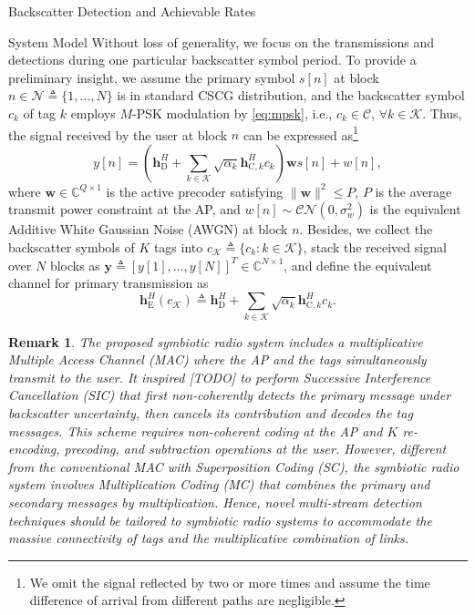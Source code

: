 \documentclass[journal]{IEEEtran}
\newtheorem{remark}{Remark}
\begin{document}
\begin{section}{Backscatter Detection and Achievable Rates}
\begin{subsection}{System Model}
			Without loss of generality, we focus on the transmissions and detections during one particular backscatter symbol period. To provide a preliminary insight, we assume the primary symbol $s[n]$ at block $n \in \mathcal{N} \triangleq \{1,\ldots,N\}$ is in standard CSCG distribution, and the backscatter symbol $c_k$ of tag $k$ employs $M$-PSK modulation by \eqref{eq:mpsk}, i.e., $c_k \in \mathcal{C}$, $\forall k \in \mathcal{K}$. Thus, the signal received by the user at block $n$ can be expressed as\footnote{We omit the signal reflected by two or more times\cite{Wu2019} and assume the time difference of arrival from different paths are negligible\cite{Guo2019b}.}
			\begin{equation}
				y[n] = \left(\boldsymbol{h}_{\mathrm{D}}^H + \sum_{k \in \mathcal{K}} \sqrt{\alpha_k} \boldsymbol{h}_{\mathrm{C},k}^H c_k\right) \boldsymbol{w} s[n] + w[n],
				\label{eq:received_signal}
			\end{equation}
			where $\boldsymbol{w} \in \mathbb{C}^{Q \times 1}$ is the active precoder satisfying $\lVert \boldsymbol{w} \rVert^2 \le P$, $P$ is the average transmit power constraint at the AP, and $w[n] \sim \mathcal{CN}(0,\sigma_w^2)$ is the equivalent Additive White Gaussian Noise (AWGN) at block $n$. Besides, we collect the backscatter symbols of $K$ tags into $c_{\mathcal{K}} \triangleq \{c_k : k \in \mathcal{K}\}$, stack the received signal over $N$ blocks as $\boldsymbol{y} \triangleq \left[y[1],\ldots,y[N]\right]^T \in \mathbb{C}^{N \times 1}$, and define the equivalent channel for primary transmission as
			\begin{equation}
				\boldsymbol{h}_{\mathrm{E}}^H(c_{\mathcal{K}}) \triangleq \boldsymbol{h}_{\mathrm{D}}^H + \sum_{k \in \mathcal{K}} \sqrt{\alpha_k} \boldsymbol{h}_{\mathrm{C},k}^H c_k.
				\label{eq:equivalent_primary_channel}
			\end{equation}

			\begin{remark}
				The proposed symbiotic radio system includes a multiplicative Multiple Access Channel (MAC) where the AP and the tags simultaneously transmit to the user. It inspired [TODO] to perform Successive Interference Cancellation (SIC) that first non-coherently detects the primary message under backscatter uncertainty, then cancels its contribution and decodes the tag messages. This scheme requires non-coherent coding at the AP and $K$ re-encoding, precoding, and subtraction operations at the user. However, different from the conventional MAC with Superposition Coding (SC), the symbiotic radio system involves Multiplication Coding (MC) that combines the primary and secondary messages by multiplication. Hence, novel multi-stream detection techniques should be tailored to symbiotic radio systems to accommodate the massive connectivity of tags and the multiplicative combination of links.
			\end{remark}
		\end{subsection}


\end{section}
\end{document}
